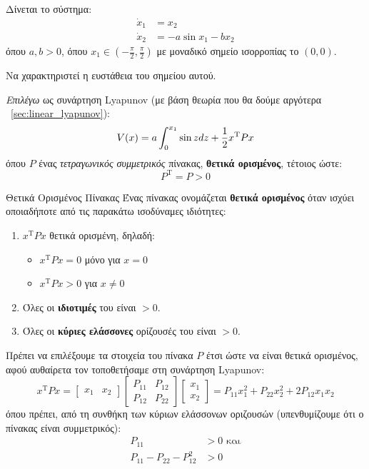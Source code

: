 \documentclass[11pt,a4paper,notitlepage,fleqn]{article}
\begin{document}
\begin{exercise}
	Δίνεται το σύστημα:
	\begin{align}
		\dot x_1 &= x_2 \label{sec1ex2m1} \\
		\dot x_2 &= -a\sin  x_1 - bx_2 \label{sec1ex2m2}
	\end{align}
	όπου \( a,b > 0 \), όπου \( x_1 \in \left(-\frac{π}{2},\frac{π}{2}\right) \) με μοναδικό σημείο ισορροπίας το \( (0,0) \).
	
	Να χαρακτηριστεί η ευστάθεια του σημείου αυτού.
	
	\tcblower
	
	\textit{Επιλέγω} ως συνάρτηση Lyapunov (με βάση θεωρία που θα δούμε αργότερα \textemdash~\autoref{sec:linear_lyapunov}):
	\[
	V(x) = a\int_{0}^{x_1} \sin z d z + \frac{1}{2} x^{\mathrm T} Px
	\]
	όπου \( P \) ένας \textit{τετραγωνικός συμμετρικός} πίνακας, \textbf{θετικά
	ορισμένος}, τέτοιος ώστε:
	\[
	P^{\mathrm T} = P > 0
	\]
	\begin{infobox}{Θετικά Ορισμένος Πίνακας}
		Ένας πίνακας ονομάζεται \textbf{θετικά ορισμένος} όταν ισχύει οποιαδήποτε
		από τις παρακάτω ισοδύναμες ιδιότητες:
		\begin{enumerate}
			\item \( x^{\mathrm T} P x \) θετικά ορισμένη, δηλαδή: \begin{itemize}
				\item \( x^{\mathrm T} P x = 0 \) μόνο για \( x = 0 \)
				\item \( x^{\mathrm T} P x > 0 \) για \( x \neq 0 \)
			\end{itemize}
			\item Όλες οι \textbf{ιδιοτιμές} του είναι \( >0 \).
			\item Όλες οι \textbf{κύριες ελάσσονες} ορίζουσές του είναι \( >0 \).
		\end{enumerate}
	\end{infobox}
	
	Πρέπει να επιλέξουμε τα στοιχεία του πίνακα \( P \) έτσι ώστε να είναι θετικά
	ορισμένος, αφού αυθαίρετα τον τοποθετήσαμε στη συνάρτηση Lyapunov:
	\[
	x^{\mathrm T} P x = \left[\begin{matrix}
	x_1 & x_2
	\end{matrix}\right]\left[
	\begin{matrix}
	P_{11} & P_{12} \\ P_{12} & P_{22}
	\end{matrix}
	\right] \left[
	\begin{matrix}
	x_1 \\ x_2
	\end{matrix}
	\right]= P_{11} x_1^2 + P_{22}x_2^2 + 2P_{12}x_1x_2
	\]
	όπου πρέπει, από τη συνθήκη των κύριων ελάσσονων οριζουσών (υπενθυμίζουμε ότι ο πίνακας είναι συμμετρικός):
	\begin{align*}
		P_{11} &> 0 \text{ και} \\ P_{11}-P_{22} - P_{12}^2 &> 0
	\end{align*}
	

\end{exercise}
\end{document}
